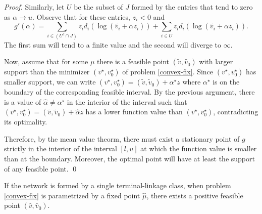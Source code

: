 \documentclass[smallextended]{svjour3}       %
\newcommand*{\0}{\mathbf{0}}
\newcommand*{\1}{\mathbf{1}}
\begin{document}
\begin{proof}
	Similarly, let $U$ be the subset of $J$ formed by the entries that tend to zero as 
	$\alpha\rightarrow u$. Observe that for these entries, $z_i<0$ and
  \[
    g'(\alpha) = \sum_{i\in (U^c\cap J)} z_i d_i(\log{(\tilde{v_i}+\alpha z_i)})
               + \sum_{i\in U}   z_i d_i(\log{(\tilde{v_i}+\alpha z_i)}).
  \]
	The first sum will tend to a finite value and the second will diverge to
	$\infty$. 
	
	Now, assume that for some $\mu$ there is a feasible point
	$(\tilde{v},\tilde{v_0})$ with larger support than the minimizer
	$(v^\star,v^\star_0)$ of problem \eqref{convex-fix}.  Since
	$(v^\star,v_0^\star)$ has smaller support, we can write  $(v^\star,
	v_0^\star) = (\tilde{v},\tilde{v}_0) + \alpha^\star z$ where $\alpha^\star$
	is on the boundary of the corresponding feasible interval.  By the
	previous argument, there is a value of $\hat \alpha \neq \alpha^\star$ in the
	interior of the interval such that $(v^\star, v_0^\star) =
	(\tilde{v},\tilde{v}_0) + \hat \alpha z$ has a lower function value than
	$(v^\star,v^\star_0)$, contradicting its optimality.

	Therefore, by the mean value theorm, there must exist a stationary point of
	$g$ strictly in the interior of the interval $[l,u]$ at which the function
	value is smaller than at the boundary.  Moreover, the optimal point will have
	at least the support of any feasible point.  
   \qed
\end{proof}



\begin{lemma}
	If the network is formed by a single terminal-linkage class, when problem
	\eqref{convex-fix} is parametrized by a fixed point $\hat\mu$,  there
	exists a positive feasible point $(\hat v,\hat v_0)$.
\label{positive-feasible}
\end{lemma}
\end{document}
